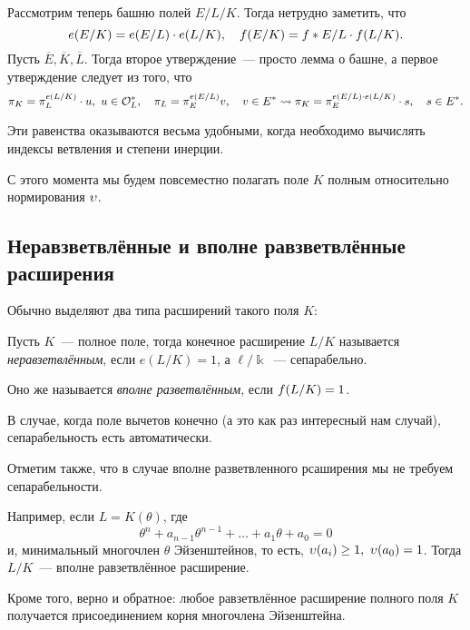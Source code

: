 	 Рассмотрим теперь башню полей $E/L/K$. Тогда нетрудно заметить, что 
	 \[
	 	e\lr*{E/K} = e\lr*{E/L} \cdot e\lr*{L/K}, \quad f\lr*{E/K} = f*{E/L} \cdot f\lr*{L/K}.
	 \]
	 Пусть $\overline{E},\overline{K}, \overline{L}$. Тогда второе утверждение~--- просто лемма о башне, а первое утверждение следует из того, что 
	 \[
	 	\pi_{K} = \pi_{L}^{e\lr*{L/K}} \cdot u, \ u \in \cO_{L}^{*}, \quad \pi_{L} = \pi_{E}^{e\lr*{E/L}} v, \quad v \in E^{*} \rightsquigarrow \pi_{K} = \pi_{E}^{e\lr*{E/L} \cdot e\lr*{L/K}} \cdot s, \quad s \in E^{*}.
	 \]

	 Эти равенства оказываются весьма удобными, когда необходимо вычислять индексы ветвления и степени инерции. 

	 С этого момента мы будем повсеместно полагать поле $K$ полным относительно нормирования $\v$. 

	 \subsection{Неравзветвлённые и вполне равзветвлённые расширения}

	 Обычно выделяют два типа расширений такого поля $K$:

	 \begin{definition} 
	 	Пусть $K$~--- полное поле, тогда конечное расширение $L/K$ называется \emph{неравзетвлённым}, если $e(L/K) = 1$, а $\ell/\Bbbk$~--- сепарабельно. 

	 	Оно же называется \emph{вполне разветвлённым}, если $f\lr*{L/K} = 1$. 
	 \end{definition}

	 \begin{remark}
	 	В случае, когда поле вычетов конечно (а это как раз интересный нам случай), сепарабельность есть автоматически. 

	 	Отметим также, что в случае вполне разветвленного рсаширения мы не требуем сепарабельности. 
	 \end{remark}

	 \begin{example}
	 	Например, если $L = K(\theta)$, где 
	 	\[
	 		\theta^n + a_{n - 1}\theta^{n - 1} + \ldots + a_1 \theta + a_0 = 0
	 	\]
	 	и, минимальный многочлен $\theta$ Эйзенштейнов, то есть, $\v(a_i) \ge 1, \ \v(a_0) = 1$. Тогда $L/K$~--- вполне равзетвлённое расширение. 

	 	Кроме того, верно и обратное: любое равзетвлённое расширение полного поля $K$ получается присоединением корня многочлена Эйзенштейна. 
	 \end{example}

